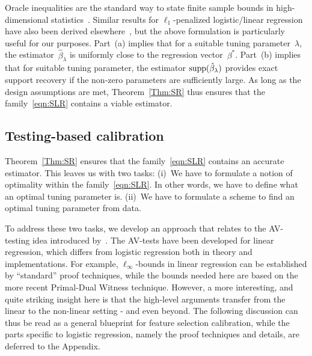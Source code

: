 \documentclass{elsarticle}
\newcommand{\oldnew}{}
\newcommand{\truepara}{{\beta^*}}
\newcommand{\estipara}{{\hat{\beta}}}
\newcommand{\tuning}{{\lambda}}
\begin{document}
\noindent Oracle inequalities are the standard way to state finite sample bounds in high-dimensional statistics~\citep{buhlmann2011statistics}. Similar results for $\ell_1$-penalized logistic/linear regression have also been derived elsewhere~\citep{bunea2008honest,chichignoud2016practical,Karim08,ravikumar2010high}, but the above formulation is particularly useful for our purposes.  Part~(a) implies that for a suitable tuning parameter~$\tuning$, the  estimator~$\estipara_{\tuning}$ is uniformly close to the regression vector~$\truepara$. Part~(b) implies that for suitable tuning parameter, the estimator $\textnormal{supp}(\estipara_{\tuning})$ provides exact support recovery if the non-zero parameters are sufficiently large. As long as the design assumptions are met, Theorem~\ref{Thm:SR} thus ensures that the family~\eqref{eqn:SLR} contains a viable estimator.

\subsection{Testing-based calibration}\label{subsec:AV}

Theorem~\ref{Thm:SR} ensures that the family~\eqref{eqn:SLR} contains an accurate estimator. This leaves us with two  tasks: (i)~We have to formulate a {\oldnew notion} of optimality within the family~\eqref{eqn:SLR}. In other words, we have to define what an optimal tuning parameter is. (ii)~We have to formulate a scheme to find an optimal tuning parameter from data.

To address these two tasks, we develop an approach that relates to the AV-testing idea introduced by~\cite{chichignoud2016practical}. The AV-tests have been developed for linear regression, which differs from logistic regression both in theory and implementations. For example, $\ell_\infty$-bounds in linear regression can be established by ``standard'' proof techniques, while the bounds needed here are based on the more recent Primal-Dual Witness technique. However, a more interesting, and quite striking insight here is that  the high-level arguments transfer from the linear to the non-linear setting - and even beyond. The following discussion can thus be read as a general blueprint for feature selection calibration, while the parts specific to logistic regression, namely the proof techniques and details, are deferred to the Appendix.
\end{document}
